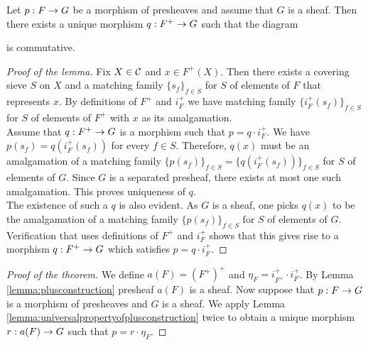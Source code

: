 \begin{lemma}\label{lemma:universalpropertyofplusconstruction}
Let $p:F\rightarrow G$ be a morphism of presheaves and assume that $G$ is a sheaf. Then there exists a unique morphism $q:F^+\rightarrow G$ such that the diagram
\begin{center}
\end{center}
is commutative.
\end{lemma}
\begin{proof}[Proof of the lemma]
Fix $X\in {\mathcal C}$ and $x\in F^+(X)$. Then there exists a covering sieve $S$ on $X$ and a matching family $\{s_f\}_{f\in S}$ for $S$ of elements of $F$ that represents $x$. By definitions of $F^+$ and $i_F^+$ we have matching family $\{i_F^+(s_f)\}_{f\in S}$ for $S$ of elements of $F^+$ with $x$ as its amalgamation.\\
Assume that $q:F^+\rightarrow G$ is a morphism such that $p=q\cdot i^+_F$.  We have $p(s_f)=q(i_F^+(s_f))$ for every $f\in S$. Therefore, $q(x)$ must be an amalgamation of a matching family $\{p(s_f)\}_{f\in S}=\{q(i^+_F(s_f))\}_{f\in S}$ for $S$ of elements of $G$. Since $G$ is a separated presheaf, there exists at most one such amalgamation. This proves uniqueness of $q$.\\
The existence of such a $q$ is also evident. As $G$ is a sheaf, one picks $q(x)$ to be the amalgamation of a matching family $\{p(s_f)\}_{f\in S}$ for $S$ of elements of $G$. Verification that uses definitions of $F^+$ and $i^+_F$ shows that this gives rise to a morphism $q:F^+\rightarrow G$ which satisfies $p=q\cdot i^+_F$.
\end{proof}

\begin{proof}[Proof of the theorem]
We define $a(F)=\left(F^+\right)^+$ and $\eta_F=i^+_{F^+}\cdot i^+_F$. By Lemma \ref{lemma:plusconstruction} presheaf $a(F)$ is a sheaf. Now suppose that $p:F\rightarrow G$ is a morphism of presheaves and $G$ is a sheaf. We apply Lemma \ref{lemma:universalpropertyofplusconstruction} twice to obtain a unique morphism $r:a(F)\rightarrow G$ such that $p=r\cdot \eta_F$.
\end{proof}

